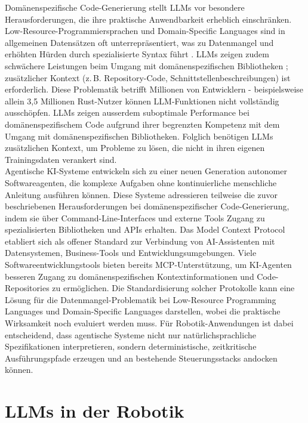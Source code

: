 \noindent Domänenspezifische Code-Generierung stellt LLMs vor besondere
Herausforderungen, die ihre praktische Anwendbarkeit erheblich einschränken.
Low-Resource-Programmiersprachen und Domain-Specific Languages sind in
allgemeinen Datensätzen oft unterrepräsentiert, was zu Datenmangel und erhöhten
Hürden durch spezialisierte Syntax führt . LLMs zeigen
zudem schwächere Leistungen beim Umgang mit domänenspezifischen Bibliotheken
; zusätzlicher Kontext (z.\,B. Repository-Code,
Schnittstellenbeschreibungen) ist erforderlich. Diese Problematik betrifft
Millionen von Entwicklern - beispielsweise allein 3,5 Millionen Rust-Nutzer
können LLM-Funktionen nicht vollständig ausschöpfen. LLMs zeigen ausserdem
suboptimale Performance bei domänenspezifischem Code aufgrund ihrer begrenzten
Kompetenz mit dem Umgang mit domänenspezifischen Bibliotheken.
 Folglich benötigen LLMs zusätzlichen Kontext, um Probleme zu
lösen, die nicht in ihren eigenen Trainingsdaten verankert sind.\\

\noindent Agentische KI-Systeme entwickeln sich zu einer neuen Generation
autonomer Softwareagenten, die komplexe Aufgaben ohne kontinuierliche
menschliche Anleitung ausführen können. Diese Systeme adressieren teilweise die
zuvor beschriebenen Herausforderungen bei domänenspezifischer Code-Generierung,
indem sie über Command-Line-Interfaces und externe Tools Zugang zu
spezialisierten Bibliotheken und APIs erhalten. Das Model Context Protocol
etabliert sich als offener Standard zur Verbindung von AI-Assistenten mit
Datensystemen, Business-Tools und Entwicklungsumgebungen.
Viele Softwareentwicklungstools bieten bereits MCP-Unterstützung, um KI-Agenten
besseren Zugang zu domänenspezifischen Kontextinformationen und
Code-Repositories zu ermöglichen. Die Standardisierung solcher Protokolle kann
eine Lösung für die Datenmangel-Problematik bei Low-Resource Programming
Languages und Domain-Specific Languages darstellen, wobei die praktische
Wirksamkeit noch evaluiert werden muss. Für Robotik-Anwendungen ist dabei
entscheidend, dass agentische Systeme nicht nur natürlichsprachliche
Spezifikationen interpretieren, sondern deterministische, zeitkritische
Ausführungspfade erzeugen und an bestehende Steuerungsstacks andocken können.

\section{LLMs in der Robotik}
